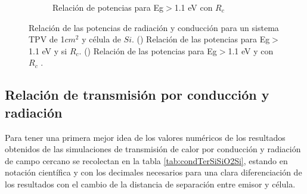 \begin{figure}[H]
\begin{subfigure}[b]{0.49\textwidth}
	\caption{Relación de potencias para Eg$>$1.1 eV con $R_c$}
	\label{fig:rel_SiSi11_Rc}
\end{subfigure}
\caption{Relación de las potencias de radiación y conducción para un sistema TPV de 1$cm^2$ y célula de $Si$. () Relación de las potencias para Eg$>$1.1 eV y si $R_c$. () Relación de las potencias para Eg$>$1.1 eV y con $R_c$ \cite{nf_TPV_Pillars_SiO2}.}
	\label{fig:rels_SiSi11}
\end{figure}
\subsection{Relación de transmisión por conducción y radiación}
Para tener una primera mejor idea de los valores numéricos de los resultados obtenidos de las simulaciones de transmisión de calor por conducción y radiación de campo cercano se recolectan en la tabla \ref{tab:condTerSiSiO2Si}, estando en notación científica y con los decimales necesarios para una clara diferenciación de los resultados con el cambio de la distancia de separación entre emisor y célula.
